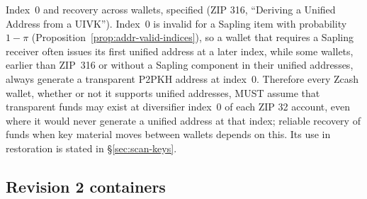 \documentclass[11pt,a4paper]{article}
\theoremstyle{definition}
\begin{document}
Index~$0$ and recovery across wallets, specified (ZIP 316, ``Deriving a
Unified Address from a UIVK''). Index~$0$ is invalid for a Sapling item with
probability $1 - \pi$ (Proposition~\ref{prop:addr-valid-indices}), so a
wallet that requires a Sapling receiver often issues its first unified
address at a later index, while some wallets, earlier than ZIP~316 or
without a Sapling component in their unified addresses, always generate a
transparent P2PKH address at
index~$0$. Therefore every Zcash wallet, whether or not it supports unified
addresses, MUST assume that transparent funds may exist at diversifier
index~$0$ of each ZIP 32 account, even where it would never generate a
unified address at that index; reliable recovery of funds when key material
moves between wallets depends on this. Its use in restoration is stated in
\S\ref{sec:scan-keys}.

\subsection{Revision 2 containers}\label{sec:addr-rev2}
\end{document}
